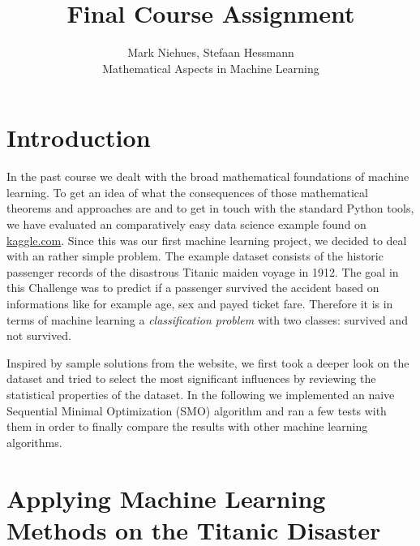 
\renewcommand{\arraystretch}{1.2} %
\usepackage{array} %


 
\title{Final Course Assignment \\ }%
\author{Mark Niehues, Stefaan Hessmann \\ %
Mathematical Aspects in Machine Learning} %

\maketitle
 
\section{Introduction}
In the past course we dealt with the broad mathematical foundations of machine learning. To get an idea of what the consequences of those mathematical theorems and approaches are and to get in touch with the standard Python tools, we have evaluated an comparatively easy data science example found on \url{kaggle.com}. Since this was our first machine learning project, we decided to deal with an rather simple problem. The example dataset \cite{Kaggle2017} consists of the historic passenger records of the disastrous Titanic maiden voyage in 1912. The goal in this Challenge was to predict if a passenger survived the accident based on informations like for example age, sex and payed ticket fare. Therefore it is in terms of machine learning a \textit{classification problem} with two classes: survived and not survived.

Inspired by sample solutions from the website, we first took a deeper look on the dataset and tried to select the most significant influences by reviewing the statistical properties of the dataset. In the following we implemented an naive Sequential Minimal Optimization (SMO) algorithm and ran a few tests with them in order to finally compare the results with other machine learning algorithms.

\section{Applying Machine Learning Methods on the Titanic Disaster}
